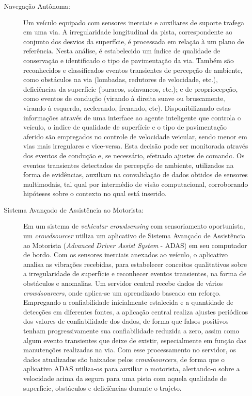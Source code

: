 \begin{description}

\item [Navegação Autônoma:] Um veículo equipado com sensores inerciais e auxiliares de suporte trafega em uma via. A irregularidade longitudinal da pista, correspondente ao conjunto dos desvios da superfície, é processada em relação à um plano de referência. Nesta análise, é estabelecido um índice de qualidade de conservação e identificado o tipo de pavimentação da via. Também são reconhecidos e classificados eventos transientes de percepção de ambiente, como obstáculos na via (lombadas, redutores de velocidade, etc.), deficiências da superfície (buracos, solavancos, etc.); e de propriocepção, como eventos de condução (virando à direita suave ou bruscamente, virando à esquerda, acelerando, frenando, etc). Disponibilizando estas informações através de uma interface ao agente inteligente que controla o veículo, o índice de qualidade de superfície e o tipo de pavimentação aferido são empregados no controle de velocidade veicular, sendo menor em vias mais irregulares e vice-versa. Esta decisão pode ser monitorada através dos eventos de condução e, se necessário, efetuado ajustes de comando. Os eventos transientes detectados de percepção de ambiente, utilizados na forma de evidências, auxiliam na convalidação de dados obtidos de sensores multimodais, tal qual por intermédio de visão computacional, corroborando hipóteses sobre o contexto no qual está inserido.

\item [Sistema Avançado de Assistência ao Motorista:] Em um sistema de \textit{vehicular crowdsensing} com sensoriamento oportunista, um \textit{crowdsourcer} utiliza um aplicativo de Sistema Avançado de Assistência ao Motorista (\textit{Advanced Driver Assist System} - ADAS) em seu computador de bordo. Com os sensores inerciais anexados ao veículo, o aplicativo analisa as vibrações recebidas, para estabelecer conceitos qualitativos sobre a irregularidade de superfície e reconhecer eventos transientes, na forma de obstáculos e anomalias. Um servidor central recebe dados de vários \textit{crowdsourcers}, onde aplica-se um aprendizado baseado em reforço. Empregando a confiabilidade inicialmente estalecida e a quantidade de detecções em diferentes fontes, a aplicação central realiza ajustes periódicos dos valores de confiabilidade dos dados, de forma que falsos positivos tenham progressivamente sua confiabilidade reduzida a zero, assim como algum evento transientes que deixe de existir, especialmente em função das manutenções realizadas na via. Com esse processamento no servidor, os dados atualizados são baixados pelos \textit{crowdsourcers}, de forma que o aplicativo ADAS utiliza-os para auxiliar o motorista, alertando-o sobre a velocidade acima da segura para uma pista com aquela qualidade de superfície, obstáculos e deficiências durante o trajeto.


\end{description}

